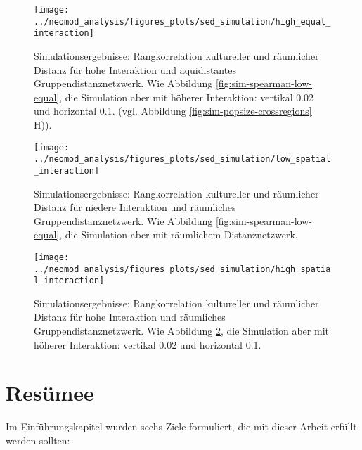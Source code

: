 \documentclass[openany,twoside,twocolumn]{book}
\let\pby\printbibliography
\renewcommand{\printbibliography}{}
\begin{document}
\begin{figure}
\texttt{[image: ../neomod\_analysis/figures\_plots/sed\_simulation/high\_equal\_interaction]} \caption[Simulationsergebnisse: Rangkorrelation kultureller und räumlicher Distanz für hohe Interaktion und äquidistantes Gruppendistanznetzwerk]{Simulationsergebnisse: Rangkorrelation kultureller und räumlicher Distanz für hohe Interaktion und äquidistantes Gruppendistanznetzwerk. Wie Abbildung \ref{fig:sim-spearman-low-equal}, die Simulation aber mit höherer Interaktion: vertikal 0.02 und horizontal 0.1. (vgl. Abbildung \ref{fig:sim-popsize-crossregions} H)).}\label{fig:sim-spearman-high-equal}
\end{figure}

\begin{figure}
\texttt{[image: ../neomod\_analysis/figures\_plots/sed\_simulation/low\_spatial\_interaction]} \caption[Simulationsergebnisse: Rangkorrelation kultureller und räumlicher Distanz für niedere Interaktion und räumliches Gruppendistanznetzwerk]{Simulationsergebnisse: Rangkorrelation kultureller und räumlicher Distanz für niedere Interaktion und räumliches Gruppendistanznetzwerk. Wie Abbildung \ref{fig:sim-spearman-low-equal}, die Simulation aber mit räumlichem Distanznetzwerk.}\label{fig:sim-spearman-low-spatial}
\end{figure}

\begin{figure}
\texttt{[image: ../neomod\_analysis/figures\_plots/sed\_simulation/high\_spatial\_interaction]} \caption[Simulationsergebnisse: Rangkorrelation kultureller und räumlicher Distanz für hohe Interaktion und räumliches Gruppendistanznetzwerk]{Simulationsergebnisse: Rangkorrelation kultureller und räumlicher Distanz für hohe Interaktion und räumliches Gruppendistanznetzwerk. Wie Abbildung \ref{fig:sim-spearman-low-spatial}, die Simulation aber mit höherer Interaktion: vertikal 0.02 und horizontal 0.1.}\label{fig:sim-spearman-high-spatial}
\end{figure}

\newpage
\newpage
\pby[title={Literatur},segment=\therefsegment,heading=subbibintoc]

\hypertarget{resumee}{%
\chapter{Resümee}\label{resumee}}

Im Einführungskapitel wurden sechs Ziele formuliert, die mit dieser Arbeit erfüllt werden sollten:
\end{document}
